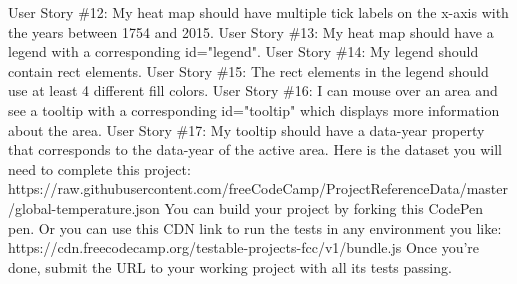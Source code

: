 \documentclass{article}%
\begin{document}
User Story \#12: My heat map should have multiple tick labels on the x{-}axis with the years between 1754 and 2015.\newline%
User Story \#13: My heat map should have a legend with a corresponding id="legend".\newline%
User Story \#14: My legend should contain rect elements.\newline%
User Story \#15: The rect elements in the legend should use at least 4 different fill colors.\newline%
User Story \#16: I can mouse over an area and see a tooltip with a corresponding id="tooltip" which displays more information about the area.\newline%
User Story \#17: My tooltip should have a data{-}year property that corresponds to the data{-}year of the active area.\newline%
Here is the dataset you will need to complete this project: https://raw.githubusercontent.com/freeCodeCamp/ProjectReferenceData/master/global{-}temperature.json\newline%
You can build your project by forking this CodePen pen. Or you can use this CDN link to run the tests in any environment you like: https://cdn.freecodecamp.org/testable{-}projects{-}fcc/v1/bundle.js\newline%
Once you're done, submit the URL to your working project with all its tests passing.\newline%

%
\end{document}
